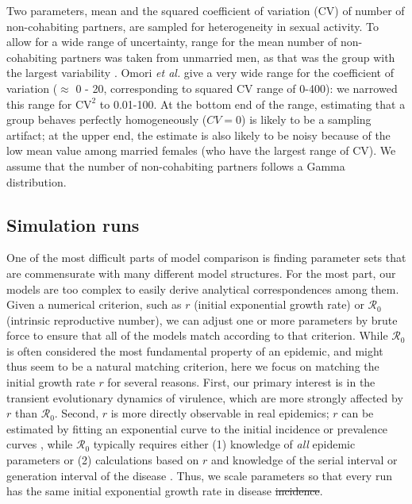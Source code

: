 \documentclass[10pt,letterpaper]{article}
\newcommand{\rzero}{{\mathcal R}_0}
\newcommand{\etal}{\textit{et al.}}
\providecommand{\DIFaddtex}[1]{{\protect\color{blue}\uwave{#1}}} %
\providecommand{\DIFdeltex}[1]{{\protect\color{red}\sout{#1}}}                      %
\providecommand{\DIFaddbegin}{} %
\providecommand{\DIFaddend}{} %
\providecommand{\DIFdelbegin}{} %
\providecommand{\DIFdelend}{} %
\providecommand{\DIFadd}[1]{\texorpdfstring{\DIFaddtex{#1}}{#1}} %
\providecommand{\DIFdel}[1]{\texorpdfstring{\DIFdeltex{#1}}{}} %
\newcommand{\DIFscaledelfig}{0.5}
\newlength{\DIFdelgraphicswidth} %
\newlength{\DIFdelgraphicsheight} %
\newcommand{\DIFaddincludegraphics}[2][]{{\color{blue}\fbox{\DIFOincludegraphics[#1]{#2}}}} %
\newcommand{\DIFdelincludegraphics}[2][]{%
\sbox{\DIFdelgraphicsbox}{\DIFOincludegraphics[#1]{#2}}%
\settoboxwidth{\DIFdelgraphicswidth}{\DIFdelgraphicsbox} %
\settoboxtotalheight{\DIFdelgraphicsheight}{\DIFdelgraphicsbox} %
\scalebox{\DIFscaledelfig}{%
\parbox[b]{\DIFdelgraphicswidth}{\usebox{\DIFdelgraphicsbox}\\[-\baselineskip] \rule{\DIFdelgraphicswidth}{0em}}\llap{\resizebox{\DIFdelgraphicswidth}{\DIFdelgraphicsheight}{%
\setlength{\unitlength}{\DIFdelgraphicswidth}%
\begin{picture}(1,1)%
\thicklines\linethickness{2pt} %
{\color[rgb]{1,0,0}\put(0,0){\framebox(1,1){}}}%
{\color[rgb]{1,0,0}\put(0,0){\line( 1,1){1}}}%
{\color[rgb]{1,0,0}\put(0,1){\line(1,-1){1}}}%
\end{picture}%
}\hspace*{3pt}}} %
} %
\DeclareRobustCommand{\DIFaddbegin}{\DIFOaddbegin \let\includegraphics\DIFaddincludegraphics} %
\DeclareRobustCommand{\DIFaddend}{\DIFOaddend \let\includegraphics\DIFOincludegraphics} %
\DeclareRobustCommand{\DIFdelbegin}{\DIFOdelbegin \let\includegraphics\DIFdelincludegraphics} %
\DeclareRobustCommand{\DIFdelend}{\DIFOaddend \let\includegraphics\DIFOincludegraphics} %
\begin{document}
Two parameters, mean and the squared coefficient of variation (CV) of number of non-cohabiting partners, are sampled for heterogeneity in sexual activity.
To allow for a wide range of uncertainty, range for the mean number of non-cohabiting partners was taken from unmarried men, as that was the group with the largest variability \cite{omori2015dynamics}. 
Omori \etal \cite{omori2015dynamics} give a very wide
range for the coefficient of variation ($\approx$ 0 - 20, corresponding
to squared CV range of 0-400):
we narrowed this range for $\textrm{CV}^2$ to 0.01-100.
At the bottom end of the range, estimating that a group behaves
perfectly homogeneously ($CV=0$) is likely to be a sampling artifact;
at the upper end, the estimate is also likely to be noisy because
of the low mean value among married females (who have the largest
range of CV). 
We assume that the number of non-cohabiting partners follows a Gamma distribution.

\subsection*{Simulation runs}

One of the most difficult parts of model comparison is finding
parameter sets that are commensurate with many different model
structures. For the most part, our models are too complex to easily
derive analytical correspondences among them. Given a numerical
criterion, such as $r$ (initial exponential growth rate) or $\rzero$ 
(intrinsic reproductive number), we can adjust one or more
parameters by brute force to ensure that all of the models match
according to that criterion. While $\rzero$ is often considered
the most fundamental property of an epidemic, and might thus seem to
be a natural matching criterion, here we focus on matching the initial
growth rate $r$ for several reasons. First, our primary interest is in
the transient evolutionary dynamics of virulence, which are more
strongly affected by $r$ than $\rzero$. Second, $r$ is 
more directly observable in real epidemics; $r$ can be estimated by
fitting an exponential curve to the initial incidence or
prevalence curves \cite{ma_estimating_2014}, while $\rzero$
typically requires either (1) knowledge of \emph{all} epidemic
parameters or (2) calculations based on
$r$ and knowledge of the serial interval or generation interval of the
disease \cite{wallinga_how_2007}. Thus, we scale parameters so that
every run has the same initial exponential growth rate in 
disease \DIFdelbegin \DIFdel{incidence}\DIFdelend \DIFaddbegin \DIFadd{prevalence}\DIFaddend .
\end{document}
